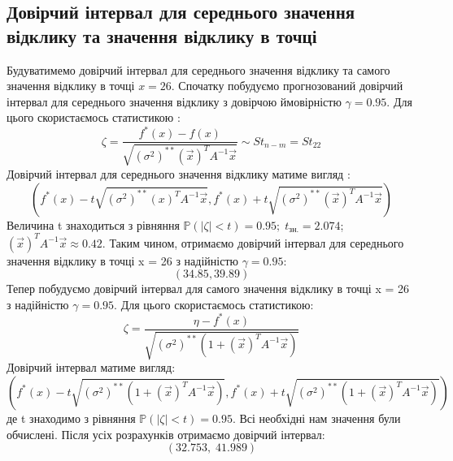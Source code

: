 \documentclass{article}
\begin{document}
    \subsection{Довірчий інтервал для середнього значення відклику та значення відклику в точці}
      Будуватимемо довірчий інтервал для середнього значення відклику та самого 
      значення відклику в точці $x = 26$.
      \newline
      Спочатку побудуємо прогнозований довірчий інтервал для середнього значення 
      відклику з довірчою ймовірністю $\gamma = 0.95$. Для цього скористаємось 
      статистикою :
      \begin{equation}
        \zeta = \frac{f^*(x) - f(x)}{\sqrt{(\sigma^2)^{**}(\vec{x})^TA^{-1}\vec{x}}}
        \sim St_{n-m} = St_{22}
      \end{equation}
      Довірчий інтервал для середнього значення відклику матиме вигляд :
      \begin{equation}
        \left( f^*(x) - t\sqrt{(\sigma^2)^{**}(x)^TA^{-1}\vec{x}}, 
        f^*(x) + t\sqrt{(\sigma^2)^{**}(\vec{x})^TA^{-1}\vec{x}} \right)
      \end{equation}
      Величина t знаходиться з рівняння $\mathbb{P}(|\zeta| < t) = 0.95; \; t_\text{зн.} = 
      2.074$;\;
      $(\vec{x})^TA^{-1}\vec{x} \approx 0.42$.
      \newline
      Таким чином, отримаємо довірчий інтервал для середнього значення відклику в 
      точці x = 26 з надійністю $\gamma = 0.95$:
      \begin{equation}
        (34.85, 39.89)
      \end{equation}
      Тепер побудуємо довірчий інтервал для самого значення відклику в точці x = 26 
      з надійністю $\gamma = 0.95$. Для цього скористаємось статистикою:
      \begin{equation}
        \zeta = \frac{\eta - f^*(x)}{\sqrt{(\sigma^2)^{**}(1 + (\vec{x})^TA^{-1}\vec{x})}}
      \end{equation}
      Довірчий інтервал матиме вигляд:
      \begin{equation}
        \left(f^*(x) - t\sqrt{(\sigma^2)^{**}(1 + (\vec{x})^TA^{-1}\vec{x})}, 
        f^*(x) + t\sqrt{(\sigma^2)^{**}(1 + (\vec{x})^TA^{-1}\vec{x})}\right)
      \end{equation}
      де t знаходимо з рівняння $\mathbb{P}(|\zeta| < t) = 0.95$.
      Всі необхідні нам значення були обчислені. Після усіх розрахунків отримаємо 
      довірчий інтервал:
      \begin{equation}
        (32.753,\;41.989)
      \end{equation}
      \newpage
\end{document}
